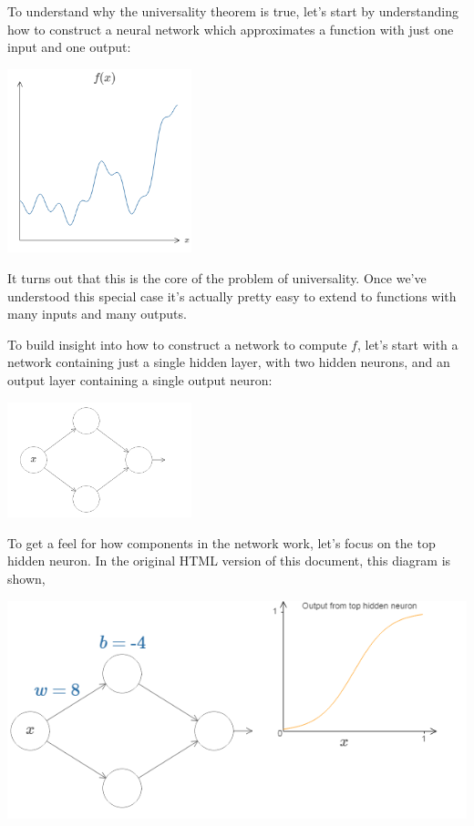 To understand why the universality theorem is true, let's start by understanding how to construct a neural network which approximates a function with just one input and one output:

{\centering \includegraphics[width=0.4\textwidth,]{pic/wigglyfn05.png} \par}

It turns out that this is the core of the problem of universality. Once we've understood this special case it's actually pretty easy to extend to functions with many inputs and many outputs.

To build insight into how to construct a network to compute $f$, let's start with a network containing just a single hidden layer, with two hidden neurons, and an output layer containing a single output neuron:

{\centering \includegraphics[width=0.4\textwidth,]{pic/wigglyfn06.png} \par}

To get a feel for how components in the network work, let's focus on the top hidden neuron. In the original HTML version of this document, this diagram is shown, 

{\centering \includegraphics[width=\textwidth,]{pic/wigglyfn07.png} \par}

